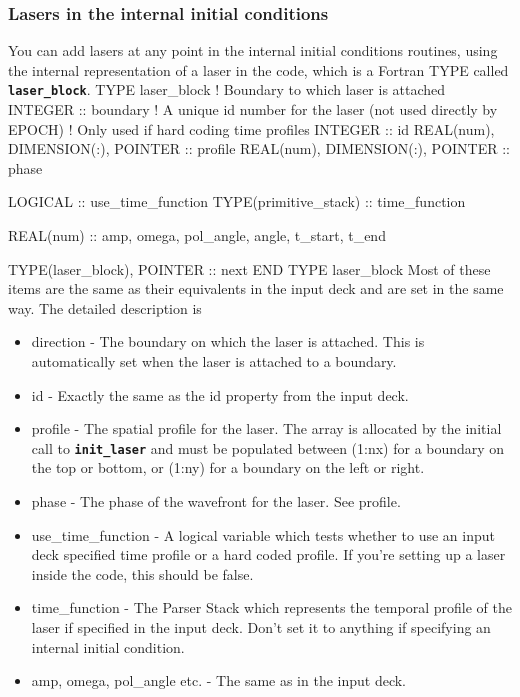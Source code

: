 \documentclass[12pt,a4paper]{article}
\newcommand{\inlinecode}[1]{{\color{warwickred} \bf\texttt{#1}}}
\newenvironment{boxverbatim}{\lboxverbatim{none}}{\endlboxverbatim}
\begin{document}
\subsubsection{Lasers in the internal initial conditions}
You can add lasers at any point in the internal initial conditions routines,
using the internal representation of a laser in the code, which is a Fortran
TYPE called \inlinecode{laser\_block}.
\begin{boxverbatim}
  TYPE laser_block
    ! Boundary to which laser is attached
    INTEGER :: boundary
    ! A unique id number for the laser (not used directly by EPOCH)
    ! Only used if hard coding time profiles
    INTEGER :: id
    REAL(num), DIMENSION(:), POINTER :: profile
    REAL(num), DIMENSION(:), POINTER :: phase

    LOGICAL :: use_time_function
    TYPE(primitive_stack) :: time_function

    REAL(num) :: amp, omega, pol_angle, angle, t_start, t_end

    TYPE(laser_block), POINTER :: next
  END TYPE laser_block
\end{boxverbatim}
Most of these items are the same as their equivalents in the input deck and
are set in the same way. The detailed description is
\begin{itemize}
\item direction - The boundary on which the laser is attached. This is
  automatically set when the laser is attached to a boundary.
\item id - Exactly the same as the id property from the input deck.
\item profile - The spatial profile for the laser. The array is allocated by
  the initial call to \inlinecode{init\_laser} and must be populated between
  (1:nx) for a boundary on the top or bottom, or (1:ny) for a boundary on the
  left or right.
\item phase - The phase of the wavefront for the laser. See profile.
\item use\_time\_function - A logical variable which tests whether to use an
  input deck specified time profile or a hard coded profile. If you're setting
  up a laser inside the code, this should be false.
\item time\_function - The Parser Stack which represents the temporal profile of
  the laser if specified in the input deck. Don't set it to anything if
  specifying an internal initial condition.
\item amp, omega, pol\_angle etc. - The same as in the input deck.
\end{itemize}
\end{document}
